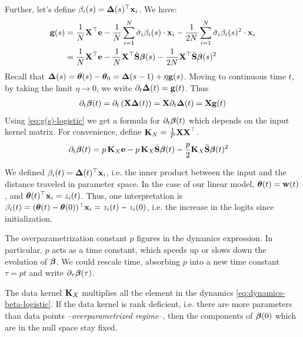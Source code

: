 \documentclass{article} %
\begin{document}
\vspace{1cm}

Further, let's define $\beta_i(s) = \mbox{$\mbox{$\boldsymbol{\Delta}$}$}(s)^\top \mbox{$\mbox{$\mathbf{x}$}$}_i$. We have: 
\begin{align}
\label{eq:g(s)-logistic}
    \vg(s) 
    &= \frac{1}{N}\vX^\top\ve - \frac{1}{N} \sum_{i=1}^N \dot\sigma_i \beta_i(s) \cdot \vx_i - \frac{1}{2N} \sum_{i=1}^N \ddot\sigma_i \beta_i(s)^2 \cdot \vx_i \\
    &= \frac{1}{N}\vX^\top\ve - \frac{1}{N}\vX^\top \dot\vS \vbeta(s) - \frac{1}{2N}\vX^\top \ddot\vS \vbeta(s)^2
\end{align}
Recall that $\mbox{$\mbox{$\boldsymbol{\Delta}$}$}(s) = \mbox{$\mbox{$\boldsymbol{\theta}$}$}(s) - \mbox{$\mbox{$\boldsymbol{\theta}$}$}_0 = \mbox{$\mbox{$\boldsymbol{\Delta}$}$}(s-1) + \eta \mbox{$\mbox{$\mathbf{g}$}$}(s)$. Moving to continuous time $t$, by taking the limit $\eta \to 0$, we write $\partial_t\mbox{$\mbox{$\boldsymbol{\Delta}$}$}(t) = \mbox{$\mbox{$\mathbf{g}$}$}(t)$. Thus 
\begin{align}
    \partial_t \mbox{$\mbox{$\boldsymbol{\beta}$}$}(t) = \partial_t\left(\mbox{$\mbox{$\mathbf{X}$}$} \mbox{$\mbox{$\boldsymbol{\Delta}$}$}(t)\right) = \mbox{$\mbox{$\mathbf{X}$}$} \partial_t\mbox{$\mbox{$\boldsymbol{\Delta}$}$}(t) = \mbox{$\mbox{$\mathbf{X}$}$} \mbox{$\mbox{$\mathbf{g}$}$}(t)
\end{align}
Using \cref{eq:g(s)-logistic} we get a formula for $\partial_t \mbox{$\mbox{$\boldsymbol{\beta}$}$}(t)$ which depends on the input kernel matrix. For convenience, define $\mbox{$\mbox{$\mathbf{K}$}$}_X = \frac{1}{P} \mbox{$\mbox{$\mathbf{X}$}$}\mbox{$\mbox{$\mathbf{X}$}$}^\top$. 
\begin{align}
\label{eq:dynamics-beta-logistic}
    \partial_t \vbeta(t) 
    &= p\,\vK_X\ve - p\,\vK_X \dot\vS \vbeta(t) - \frac{p}{2}\vK_X\ddot\vS \vbeta(t)^2 
\end{align}


\begin{remark}
\label{remark:interpretation-of-beta}
We defined $\beta_i(t) = \mbox{$\mbox{$\boldsymbol{\Delta}$}$}(t)^\top \mbox{$\mbox{$\mathbf{x}$}$}_i$, i.e. the inner product between the input and the distance traveled in parameter space. In the case of our linear model, $\mbox{$\mbox{$\boldsymbol{\theta}$}$}(t) = \mbox{$\mbox{$\mathbf{w}$}$}(t)$, and $\mbox{$\mbox{$\boldsymbol{\theta}$}$}(t)^\top\mbox{$\mbox{$\mathbf{x}$}$}_i = z_i(t)$. Thus, one interpretation is $\beta_i(t) = (\mbox{$\mbox{$\boldsymbol{\theta}$}$}(t) - \mbox{$\mbox{$\boldsymbol{\theta}$}$}(0))^\top\mbox{$\mbox{$\mathbf{x}$}$}_i = z_i(t) - z_i(0)$, i.e. the increase in the logits since initialization. 
\end{remark}
\begin{remark}
    The overparametrization constant $p$ figures in the dynamics expression. In particular, $p$ acts as a time constant, which speeds up or slows down the evolution of $\mbox{$\mbox{$\boldsymbol{\beta}$}$}$. We could rescale time, absorbing $p$ into a new time constant $\tau = pt$ and write $\partial_\tau \mbox{$\mbox{$\boldsymbol{\beta}$}$}(\tau)$.
\end{remark}
\begin{remark}
The data kernel $\mbox{$\mbox{$\mathbf{K}$}$}_X$ multiplies all the element in the dynamics \cref{eq:dynamics-beta-logistic}. If the data kernel is rank deficient, i.e. there are more parameters than data points --\emph{overparametrized regime}--, then the components of $\mbox{$\mbox{$\boldsymbol{\beta}$}$}(0)$ which are in the null space stay fixed. 
\end{remark}
\end{document}
